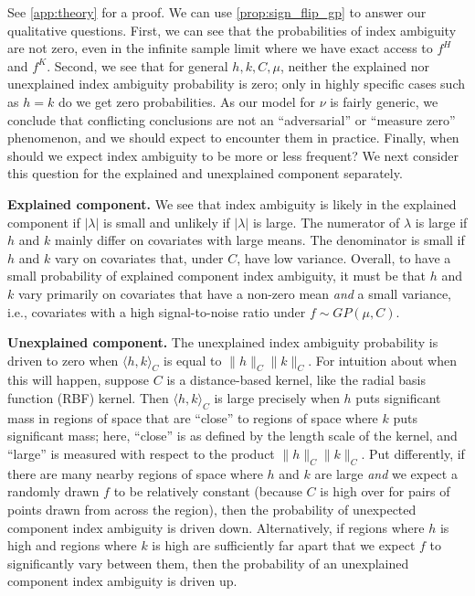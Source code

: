 See \cref{app:theory} for a proof.
We can use \cref{prop:sign_flip_gp} to answer our qualitative questions.
First, we can see that the probabilities of index ambiguity are not zero, even in the infinite sample limit where we have exact access to $f^H$ and $f^K$.
Second, we see that for general $h,k, C,\mu$, neither the explained nor unexplained index ambiguity probability is zero; only in highly specific cases such as $h = k$ do we get zero probabilities.
As our model for $\nu$ is fairly generic, we conclude that conflicting conclusions are not an ``adversarial'' or ``measure zero'' phenomenon, and we should expect to encounter them in practice.
Finally, when should we expect index ambiguity to be more or less frequent?
We next consider this question for the explained and unexplained component separately.

\textbf{Explained component.} We see that index ambiguity is likely in the explained component if $| \lambda |$ is small and unlikely if $|\lambda|$ is large.
The numerator of $\lambda$ is large if $h$ and $k$ mainly differ on covariates with large means.
The denominator is small if $h$ and $k$ vary on covariates that, under $C$, have low variance.
Overall, to have a small probability of explained component index ambiguity, it must be that $h$ and $k$ vary primarily on covariates that have a non-zero mean \emph{and} a small variance, i.e., covariates with a high signal-to-noise ratio under $f \sim GP(\mu, C)$.

\textbf{Unexplained component.}
The unexplained index ambiguity probability is driven to zero when $\langle h,k\rangle_C$ is equal to $\| h\|_C \| k \|_C$. 
For intuition about when this will happen, suppose $C$ is a distance-based kernel, like the radial basis function (RBF) kernel. 
Then $\langle h,k\rangle_C$ is large precisely when $h$ puts significant mass in regions of space that are ``close'' to regions of space where $k$ puts significant mass; here, ``close'' is as defined by the length scale of the kernel, and ``large'' is measured with respect to the product $\|h\|_C \|k\|_C$. 
Put differently, if there are many nearby regions of space where $h$ and $k$ are large \emph{and} we expect a randomly drawn $f$ to be relatively constant (because $C$ is high over for pairs of points drawn from across the region), then the probability of unexpected  component index ambiguity is driven down.
Alternatively, if regions where $h$ is high and regions where $k$ is high are sufficiently far apart that we expect $f$ to significantly vary between them, then the probability of an unexplained component index ambiguity is driven up.


